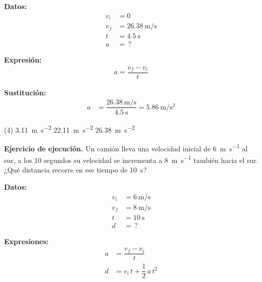 \documentclass[12pt, letter]{exam}
\begin{document}
\begin{questions}
    \vspace*{0.3cm}
    \begin{minipage}[t]{0.35\linewidth}
    \textbf{Datos: }
    \begin{align*}
    v_{i} &= 0 \\
    v_{f} &= \SI{26.38}{\meter\per\second} \\
    t &= \SI{4.5}{\second} \\
    a &= \, ?
    \end{align*}
    \end{minipage}
    \hspace{1cm}
    \begin{minipage}[t]{0.4\linewidth}
    \textbf{Expresión:}
    \begin{align*}
    a = \dfrac{v_{f} - v_{i}}{t}
    \end{align*}
    \end{minipage}
    
    \vspace*{0.3cm}
    \textbf{Sustitución:}
    \begin{align*}
    a &= \dfrac{\displaystyle \SI[per-mode=fraction]{26.38}{\meter\per\second}}{\SI{4.5}{\second}} = \SI[per-mode=fraction]{5.86}{\meter\per\square\second}
    \end{align*}

    \begin{tasks}(4)
        \task \SI{3.11}{\meter\per\square\second}
        \task {}
        \task \SI{22.11}{\meter\per\square\second}
        \task \SI{26.38}{\meter\per\square\second}
    \end{tasks}
    \setcounter{question}{7} \question \label{Ejercicio_04} \textbf{Ejercicio de ejecución.} Un camión lleva una velocidad inicial de \SI{6}{\meter\per\second} al sur, a los \num{10} segundos su velocidad se incrementa a \SI{8}{\meter\per\second} también hacia el sur. ¿Qué distancia recorre en ese tiempo de \SI{10}{\second}?

    \vspace*{0.3cm}
    \begin{minipage}[t]{0.35\linewidth}
    \textbf{Datos: }
    \begin{align*}
    v_{i} &= \SI{6}{\meter\per\second} \\
    v_{f} &= \SI{8}{\meter\per\second} \\
    t &= \SI{10}{\second} \\
    d &= \, ?
    \end{align*}
    \end{minipage}
    \hspace{1cm}
    \begin{minipage}[t]{0.4\linewidth}
    \textbf{Expresiones:}
    \begin{align*}
    a &= \dfrac{v_{f} - v_{i}}{t} \\
    d &= v_{i} \, t + \dfrac{1}{2} \, a \, t^{2}
    \end{align*}
    \end{minipage}


\end{questions}
\end{document}
